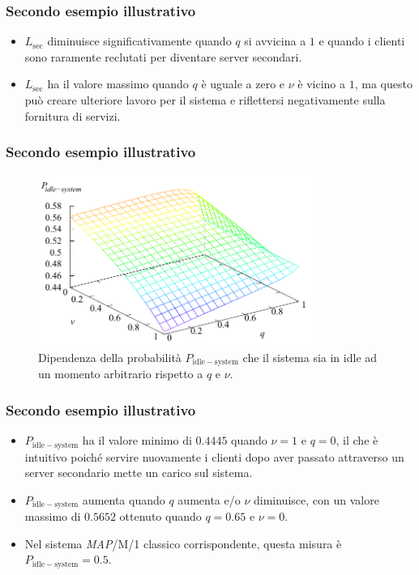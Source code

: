 \documentclass{beamer}
\begin{document}
\begin{frame}
    \frametitle{Secondo esempio illustrativo}
    \begin{itemize}
        \item $L_\mathrm{sec}$ diminuisce significativamente quando $q$ si avvicina a $1$ e quando i clienti sono raramente reclutati per diventare server secondari.
        \item $L_\mathrm{sec}$ ha il valore massimo quando $q$ è uguale a zero e $\nu$ è vicino a $1$, ma questo può creare ulteriore lavoro per il sistema e riflettersi negativamente sulla fornitura di servizi.
    \end{itemize}
\end{frame}


\begin{frame}
    \frametitle{Secondo esempio illustrativo}
    \begin{figure}[h!]
        \centering
        \includegraphics[width=0.8\textwidth]{3zlg6uj.png}
        \caption{Dipendenza della probabilità $P_\mathrm{idle-system}$ che il sistema sia in idle ad un momento arbitrario rispetto a $q$ e $\nu$.}
    \end{figure}
\end{frame}


\begin{frame}
    \frametitle{Secondo esempio illustrativo}
    \begin{itemize}
        \item $P_\mathrm{idle-system}$ ha il valore minimo di $0.4445$ quando $\nu=1$ e $q=0$, il che è intuitivo poiché servire nuovamente i clienti dopo aver passato attraverso un server secondario mette un carico sul sistema.
        \item $P_\mathrm{idle-system}$ aumenta quando $q$ aumenta e/o $\nu$ diminuisce, con un valore massimo di $0.5652$ ottenuto quando $q=0.65$ e $\nu=0$.
        \item Nel sistema \emph{MAP}/M/1 classico corrispondente, questa misura è $P_\mathrm{idle-system}=0.5$.
    \end{itemize}
\end{frame}
\end{document}
